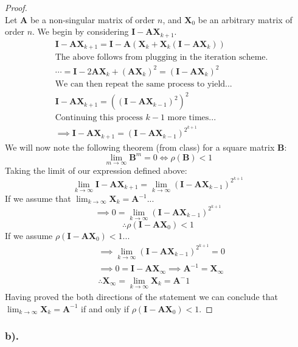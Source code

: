 \documentclass[11pt]{article}
\begin{document}
\begin{proof}~\\
	Let \(\mathbf{A}\) be a non-singular matrix of order \(n\), and \(\mathbf{X}_0\) be an arbitrary matrix of order \(n\). We begin by considering \(\mathbf{I}-\mathbf{AX}_{k+1}\).
	\begin{align*}
		&\mathbf{I}-\mathbf{AX}_{k+1} = \mathbf{I}-\mathbf{A}(\mathbf{X}_k+\mathbf{X}_k(\mathbf{I}-\mathbf{AX}_k))\\
		&\text{The above follows from plugging in the iteration scheme.}\\
		&\cdots=\mathbf{I}-2\mathbf{AX}_k+(\mathbf{AX}_k)^2=(\mathbf{I}-\mathbf{AX}_k)^2\\
		&\text{We can then repeat the same process to yield...}\\
		&\mathbf{I}-\mathbf{AX}_{k+1} = ((\mathbf{I}-\mathbf{AX}_{k-1})^2)^2\\
		&\text{Continuing this process \(k-1\) more times...}\\
		&\implies \mathbf{I}-\mathbf{AX}_{k+1} = (\mathbf{I}-\mathbf{AX}_{k-1})^{2^{k+1}}
	\end{align*}
	We will now note the following theorem (from class) for a square matrix $\mathbf{B}$:
	\[\lim_{m\to\infty}\mathbf{B}^m = 0 \Leftrightarrow \rho(\mathbf{B})<1\]
	Taking the limit of our expression defined above:
	\[\lim_{k\to\infty}\mathbf{I}-\mathbf{AX}_{k+1} = \lim_{k\to\infty} (\mathbf{I}-\mathbf{AX}_{k-1})^{2^{k+1}}\]
	If we assume that \(\lim_{k\to\infty}\mathbf{X}_k=\mathbf{A}^{-1}\)...
	\[\implies 0 = \lim_{k\to\infty} (\mathbf{I}-\mathbf{AX}_{k-1})^{2^{k+1}}\]
	\[\therefore \rho(\mathbf{I}-\mathbf{AX}_0)<1\]
	If we assume \(\rho(\mathbf{I}-\mathbf{AX}_0)<1\)...
	\begin{align*}
		&\implies \lim_{k\to\infty} (\mathbf{I}-\mathbf{AX}_{k-1})^{2^{k+1}} = 0\\
		&\implies 0 = \mathbf{I} - \mathbf{AX}_{\infty} \implies \mathbf{A}^{-1} = \mathbf{X}_{\infty}\\
		&\therefore \mathbf{X}_{\infty}=\lim_{k\to\infty}\mathbf{X}_k=\mathbf{A}^-1
	\end{align*}
	Having proved the both directions of the statement we can conclude that \(\lim_{k\to\infty}\mathbf{X}_k=\mathbf{A}^{-1}\) if
	and only if \(\rho(\mathbf{I}-\mathbf{AX}_0)<1\).
\end{proof}

\newpage
    \hypertarget{b.}{%
\subsubsection*{b).}\label{b.}}
\end{document}
